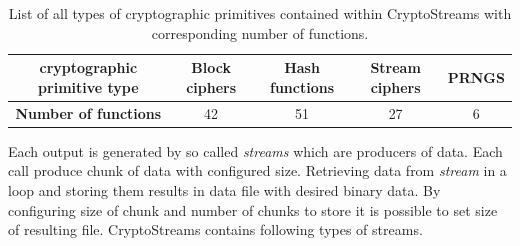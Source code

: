 \documentclass[
    digital,    %
    oneside,    %
    color,
    11pt,
    nocover,
    notable,
    nolof,
    nolot,
    final
]{fithesis3}
\begin{document}
\begin{table}[t]
	\centering	
	\begin{tabular}{c|c c c c}
		\textbf{\large cryptographic primitive type} &  Block ciphers &  Hash functions &  Stream ciphers &  PRNGS  \\ \hline
		\textbf{\large Number of functions} & 42	&	51		&		27	&		6	\\
		
	\end{tabular}
	\caption{List of all types of cryptographic primitives contained within CryptoStreams with corresponding number of functions.}
	\label{table:all-cryptoprimitives}
\end{table}

Each output is generated by so called \textit{streams} which are producers of data. Each call produce chunk of data with configured size. Retrieving data from \textit{stream} in a loop and storing them results in data file with desired binary data. By configuring size of chunk and number of chunks to store it is possible to set size of resulting file. CryptoStreams contains following types of streams.
\end{document}
